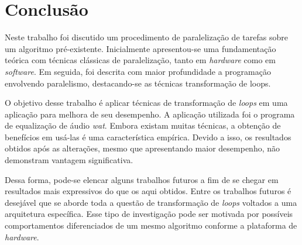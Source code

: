 \chapter{Conclusão}

Neste trabalho foi discutido um procedimento de paralelização de tarefas sobre 
um algoritmo pré-existente. 
Inicialmente apresentou-se uma fundamentação teórica com técnicas clássicas de 
paralelização, tanto em \textit{hardware} como em \textit{software}. 
Em seguida, foi descrita com maior profundidade a programação envolvendo 
paralelismo, destacando-se as técnicas transformação de loops.

O objetivo desse trabalho é aplicar técnicas de transformação de \textit{loops} 
em uma aplicação para melhora de seu desempenho. 
A aplicação utilizada foi o programa de equalização de áudio \textit{wat}. 
Embora existam muitas técnicas, a obtenção de benefícios em usá-las é uma 
característica empírica. 
Devido a isso, os resultados obtidos após as alterações, 
mesmo que apresentando maior desempenho, não demonstram vantagem significativa.

Dessa forma, pode-se elencar alguns trabalhos futuros a fim de se chegar em 
resultados mais expressivos do que os aqui obtidos. 
Entre os trabalhos futuros é desejável que se aborde toda a questão de 
transformação de \textit{loops} voltados a uma arquitetura específica. 
Esse tipo de investigação pode ser motivada por possíveis comportamentos 
diferenciados de um mesmo algoritmo conforme a plataforma de 
\textit{hardware}.
